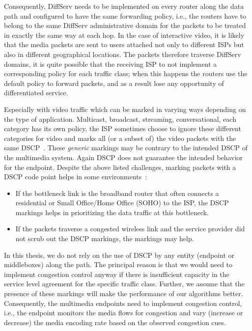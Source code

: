 
Consequently, DiffServ needs to be implemented on every router along the data
path and configured to have the same forwarding policy, i.e., the routers have
to belong to the same DiffServ administrative domain for the packets to be
treated in exactly the same way at each hop. In the case of interactive video,
it is likely that the media packets are sent to users attached not only to
different ISPs but also in different geographical locations. The packets
therefore traverse DiffServ domains, it is quite possible that the receiving
ISP to not implement a corresponding policy for each  traffic class; when this
happens the routers use the default policy to forward packets, and as a result
lose any opportunity of differentiated service.


Especially with video traffic which can be marked in varying ways depending on
the type of application. Multicast, broadcast, streaming, conversational, each
category has its own policy, the ISP sometimes choose to ignore these
different categories for video and marks all (or a subset of) the video
packets with the same DSCP~\cite{rfc5865}. These \emph{generic} markings may
be contrary to the intended DSCP of the multimedia system. Again DSCP does not
guarantee the intended behavior for the endpoint. Despite the above listed
challenges, marking packets with a DSCP code point helps in some
environments~\cite{draft.rtcweb.qos}:


\begin{itemize}

  \item If the bottleneck link is the broadband router that often connects a
  residential or Small Office/Home Office (SOHO) to the ISP, the DSCP markings
  helps in prioritizing the data traffic at this bottleneck.

  \item If the packets traverse a congested wireless link and the service
  provider did not scrub out the DSCP markings, the markings may help.

\end{itemize}

In this thesis, we do not rely on the use of DSCP by any entity (endpoint or
middleboxes) along the path. The principal reason is that we would need to
implement congestion control anyway if there is insufficient capacity in the
service level agreement for the specific traffic class. Further, we assume
that the presence of these markings will make the performance of our
algorithms better. Consequently, the multimedia endpoints need to implement
congestion control, i.e., the endpoint monitors the media flows for congestion
and vary (increase or decrease) the media encoding rate based on the observed
congestion cues.


